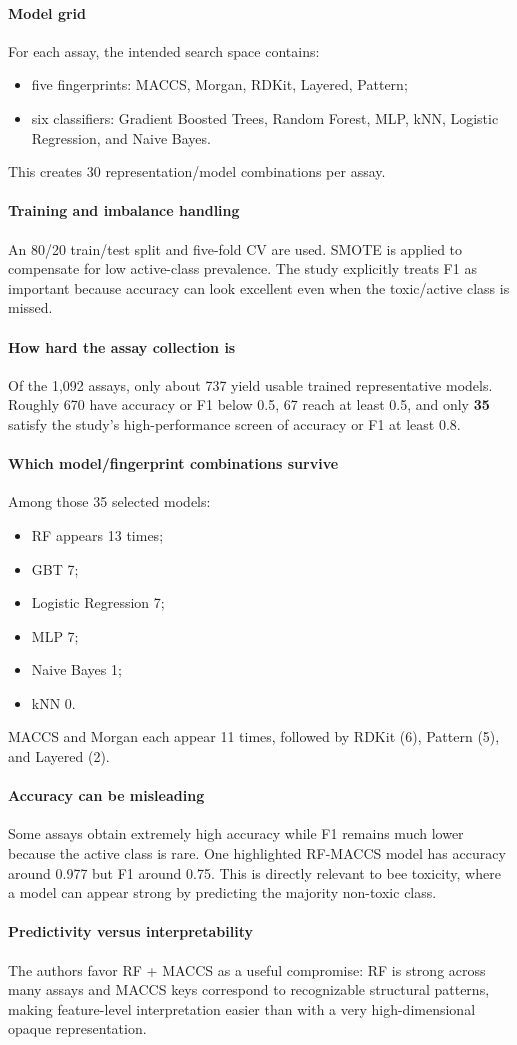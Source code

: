 \documentclass[11pt]{article}
\newcommand{\reviewfield}[2]{\paragraph{#1}#2}
\begin{document}
\reviewfield{Model grid}{
For each assay, the intended search space contains:
\begin{itemize}
    \item five fingerprints: MACCS, Morgan, RDKit, Layered, Pattern;
    \item six classifiers: Gradient Boosted Trees, Random Forest, MLP, kNN, Logistic Regression, and Naive Bayes.
\end{itemize}
This creates 30 representation/model combinations per assay.
}

\reviewfield{Training and imbalance handling}{
An 80/20 train/test split and five-fold CV are used. SMOTE is applied to compensate for low active-class prevalence. The study explicitly treats F1 as important because accuracy can look excellent even when the toxic/active class is missed.
}

\reviewfield{How hard the assay collection is}{
Of the 1,092 assays, only about 737 yield usable trained representative models. Roughly 670 have accuracy or F1 below 0.5, 67 reach at least 0.5, and only \textbf{35} satisfy the study's high-performance screen of accuracy or F1 at least 0.8.
}

\reviewfield{Which model/fingerprint combinations survive}{
Among those 35 selected models:
\begin{itemize}
    \item RF appears 13 times;
    \item GBT 7;
    \item Logistic Regression 7;
    \item MLP 7;
    \item Naive Bayes 1;
    \item kNN 0.
\end{itemize}
MACCS and Morgan each appear 11 times, followed by RDKit (6), Pattern (5), and Layered (2).
}

\reviewfield{Accuracy can be misleading}{
Some assays obtain extremely high accuracy while F1 remains much lower because the active class is rare. One highlighted RF-MACCS model has accuracy around 0.977 but F1 around 0.75. This is directly relevant to bee toxicity, where a model can appear strong by predicting the majority non-toxic class.
}

\reviewfield{Predictivity versus interpretability}{
The authors favor RF + MACCS as a useful compromise: RF is strong across many assays and MACCS keys correspond to recognizable structural patterns, making feature-level interpretation easier than with a very high-dimensional opaque representation.
}
\end{document}
